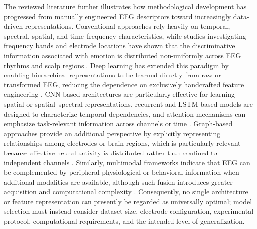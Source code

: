 \documentclass{WileyMSP-template}
\begin{document}
The reviewed literature further illustrates how methodological development has progressed from manually engineered EEG descriptors toward increasingly data-driven representations. Conventional approaches rely heavily on temporal, spectral, spatial, and time--frequency characteristics, while studies investigating frequency bands and electrode locations have shown that the discriminative information associated with emotion is distributed non-uniformly across EEG rhythms and scalp regions \cite{zheng2015eeg}. Deep learning has extended this paradigm by enabling hierarchical representations to be learned directly from raw or transformed EEG, reducing the dependence on exclusively handcrafted feature engineering \cite{roy2019dleegreview}. CNN-based architectures are particularly effective for learning spatial or spatial--spectral representations, recurrent and LSTM-based models are designed to characterize temporal dependencies, and attention mechanisms can emphasize task-relevant information across channels or time \cite{kim2020lstmatt}. Graph-based approaches provide an additional perspective by explicitly representing relationships among electrodes or brain regions, which is particularly relevant because affective neural activity is distributed rather than confined to independent channels \cite{zhong2020rgnn}. Similarly, multimodal frameworks indicate that EEG can be complemented by peripheral physiological or behavioral information when additional modalities are available, although such fusion introduces greater acquisition and computational complexity \cite{zheng2019emotionmeter}. Consequently, no single architecture or feature representation can presently be regarded as universally optimal; model selection must instead consider dataset size, electrode configuration, experimental protocol, computational requirements, and the intended level of generalization.
\end{document}
